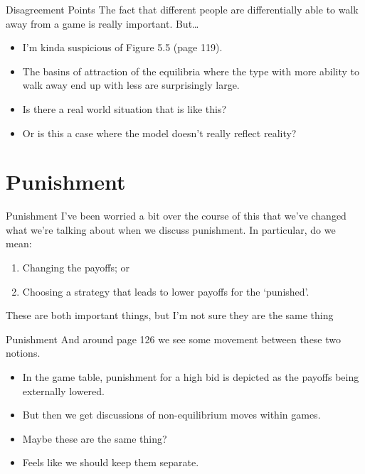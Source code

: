 \documentclass[
  ignorenonframetext,
]{beamer}
\providecommand{\tightlist}{%
  \setlength{\itemsep}{0pt}\setlength{\parskip}{0pt}}
\begin{document}
\begin{frame}{Disagreement Points}
\protect\hypertarget{disagreement-points-1}{}
The fact that different people are differentially able to walk away from
a game is really important. But\ldots{}

\begin{itemize}
\tightlist
\item
  I'm kinda suspicious of Figure 5.5 (page 119).
\item
  The basins of attraction of the equilibria where the type with more
  ability to walk away end up with less are surprisingly large.
\item
  Is there a real world situation that is like this?
\item
  Or is this a case where the model doesn't really reflect reality?
\end{itemize}
\end{frame}

\hypertarget{punishment}{%
\section{Punishment}\label{punishment}}

\begin{frame}{Punishment}
\protect\hypertarget{punishment-1}{}
I've been worried a bit over the course of this that we've changed what
we're talking about when we discuss punishment. In particular, do we
mean:

\begin{enumerate}
\tightlist
\item
  Changing the payoffs; or
\item
  Choosing a strategy that leads to lower payoffs for the `punished'.
\end{enumerate}

These are both important things, but I'm not sure they are the same
thing
\end{frame}

\begin{frame}{Punishment}
\protect\hypertarget{punishment-2}{}
And around page 126 we see some movement between these two notions.

\begin{itemize}
\tightlist
\item
  In the game table, punishment for a high bid is depicted as the
  payoffs being externally lowered.
\item
  But then we get discussions of non-equilibrium moves within games.
\item
  Maybe these are the same thing?
\item
  Feels like we should keep them separate.
\end{itemize}
\end{frame}
\end{document}
